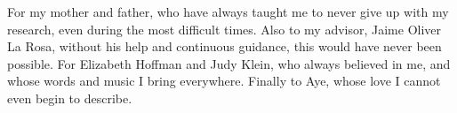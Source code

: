 For my mother and father, who have always taught me to never give up with my research, even during the most difficult times. Also to my advisor, Jaime Oliver La Rosa, without his help and continuous guidance, this would have never been possible. For Elizabeth Hoffman and Judy Klein, who always believed in me, and whose words and music I bring everywhere. Finally to Aye, whose love I cannot even begin to describe.